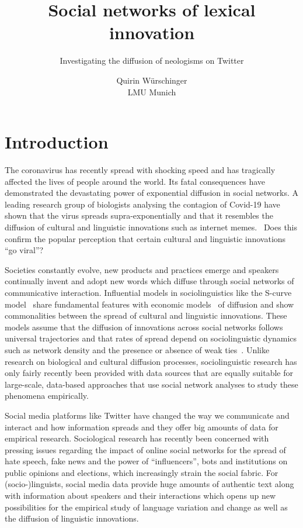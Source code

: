 \documentclass[
  a4paper,
  ]{scrartcl}
\begin{document}

  \title{Social networks of lexical innovation}
  \subtitle{Investigating the diffusion of neologisms on Twitter}
  \author{Quirin Würschinger\\ LMU Munich}
  \maketitle

\listoftodos

\tableofcontents


  \cleardoublepage

\section{Introduction}

  The coronavirus has recently spread with shocking speed and has tragically affected the lives of people around the world. Its fatal consequences have demonstrated the devastating power of exponential diffusion in social networks. A leading research group of biologists analysing the contagion of Covid-19 have shown that the virus spreads supra-exponentially and that it resembles the diffusion of cultural and linguistic innovations such as internet memes.~\parencite{EandT2020} Does this confirm the popular perception that certain cultural and linguistic innovations \enquote{go viral}?

  Societies constantly evolve, new products and practices emerge and speakers continually invent and adopt new words which diffuse through social networks of communicative interaction. Influential models in sociolinguistics like the S-curve model~\parencite{Milroy1992} share fundamental features with economic models~\parencite{Rogers1962} of diffusion and show commonalities between the spread of cultural and linguistic innovations. These models assume that the diffusion of innovations across social networks follows universal trajectories and that rates of spread depend on sociolinguistic dynamics such as network density and the presence or absence of weak ties~\parencite{Granovetter1977}. Unlike research on biological and cultural diffusion processes, sociolinguistic research has only fairly recently been provided with data sources that are equally suitable for large-scale, data-based approaches that use social network analyses to study these phenomena empirically.

  Social media platforms like Twitter have changed the way we communicate and interact and how information spreads and they offer big amounts of data for empirical research. Sociological research has recently been concerned with pressing issues regarding the impact of online social networks for the spread of hate speech, fake news and the power of \enquote{influencers}, bots and institutions on public opinions and elections, which increasingly strain the social fabric. For (socio-)linguists, social media data provide huge amounts of authentic text along with information about speakers and their interactions which opens up new possibilities for the empirical study of language variation and change as well as the diffusion of linguistic innovations.
\end{document}
